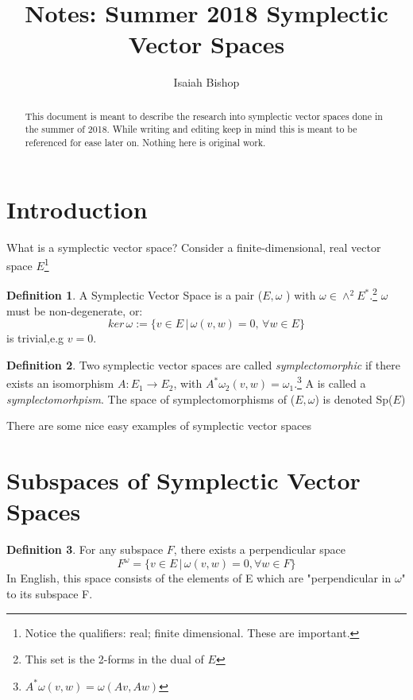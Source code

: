\documentclass[12pt]{article}
\title{Notes: Summer 2018 Symplectic Vector Spaces}
\author{Isaiah Bishop}
\theoremstyle{definition}
\newtheorem{definition}{Definition}[section]
\begin{document}
\fancyhead{}
\fancyfoot{}			

\maketitle

\begin{abstract}
This document is meant to describe the research into symplectic vector spaces done in the summer of 2018. While writing and editing keep in mind this is meant to be referenced for ease later on. Nothing here is original work.
\end{abstract}

\section{Introduction}
What is a symplectic vector space? Consider a finite-dimensional, real vector space $E$\footnote{Notice the qualifiers: real; finite dimensional. These are important.}

\theoremstyle{definition}
\begin{definition}
A Symplectic Vector Space is a pair ($ E,\omega$ ) with $\omega \in \wedge ^ 2 E ^ *$.\footnote{This set is the 2-forms in the dual of $E$} $\omega$ must be non-degenerate, or:
\[ ker \, \omega := \{ v \in E \, | \, \omega(v,w) =0, \, \forall w \in E \} \] 
is trivial,e.g $v=0$.
\end{definition}

\theoremstyle{definition}
\begin{definition}
Two symplectic vector spaces are called \textit{symplectomorphic } if there exists an isomorphism $A : E_1 \rightarrow E_2$, with $A^* \omega_2(v,w)= \omega_1$.\footnote{$A^* \omega(v,w)= \omega( Av,Aw)$} A is called a \textit{symplectomorhpism}. The space of symplectomorphisms of ($E, \omega$) is denoted Sp($E$)
\end{definition}

There are some nice easy examples of symplectic vector spaces

\section{Subspaces of Symplectic Vector Spaces}

\theoremstyle{definition}
\begin{definition}
For any subspace $F$, there exists a perpendicular space $$ F^\omega = \{ v \in E \, | \, \omega(v,w)=0, \forall w \in F \}$$
In English, this space consists of the elements of E which are "perpendicular in $\omega$" to its subspace F. 
\end{definition}
\end{document}
